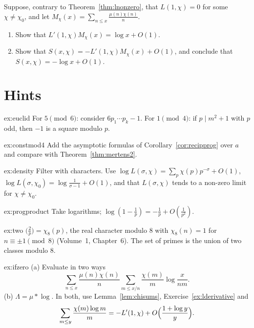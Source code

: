 \begin{exercise}[$\star\star$]\label{ex:ifzero}
Suppose, contrary to Theorem~\ref{thm:lnonzero}, that $L(1,\chi)=0$ for some $\chi\ne\chi_0$, and let $M_\chi(x)=\sum_{n\le x}\frac{\mu(n)\chi(n)}n$.
\begin{enumerate}[label=(\alph*)]
\item Show that $L'(1,\chi)M_\chi(x)=\log x+O(1)$.
\item Show that $S(x,\chi)=-L'(1,\chi)M_\chi(x)+O(1)$, and conclude that $S(x,\chi)=-\log x+O(1)$.
\end{enumerate}
\end{exercise}

\section{Hints}

\begin{hint}{ex:euclid}
For $5\pmod6$: consider $6p_1\cdots p_k-1$. For $1\pmod4$: if $p\mid m^2+1$ with $p$ odd, then $-1$ is a square modulo $p$.
\end{hint}
\begin{hint}{ex:constmod4}
Add the asymptotic formulas of Corollary~\ref{cor:recipprog} over $a$ and compare with Theorem~\ref{thm:mertens2}.
\end{hint}
\begin{hint}{ex:density}
Filter with characters. Use $\log L(\sigma,\chi)=\sum_p\chi(p)p^{-\sigma}+O(1)$, $\log L(\sigma,\chi_0)=\log\frac1{\sigma-1}+O(1)$, and that $L(\sigma,\chi)$ tends to a non-zero limit for $\chi\ne\chi_0$.
\end{hint}
\begin{hint}{ex:progproduct}
Take logarithms; $\log(1-\frac1p)=-\frac1p+O(\frac1{p^2})$.
\end{hint}
\begin{hint}{ex:two}
$\bigl(\frac2p\bigr)=\chi_8(p)$, the real character modulo $8$ with $\chi_8(n)=1$ for $n\equiv\pm1\pmod8$ (Volume~1, Chapter~6). The set of primes is the union of two
classes modulo $8$.
\end{hint}
\begin{hint}{ex:ifzero}
(a) Evaluate in two ways
\[
\sum_{n\le x}\frac{\mu(n)\chi(n)}n\sum_{m\le x/n}\frac{\chi(m)}m\log\frac x{nm}.
\]
(b) $\Lambda=\mu*\log$. In both, use Lemma~\ref{lem:chisums}, Exercise~\ref{ex:lderivative} and
\[
\sum_{m\le y}\frac{\chi(m)\log m}m=-L'(1,\chi)+O\Bigl(\frac{1+\log y}y\Bigr).
\]
\end{hint}

